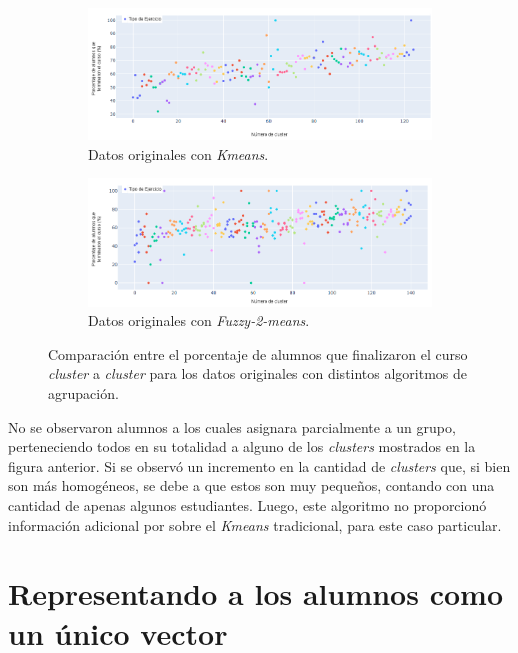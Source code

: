 \documentclass[11pt,a4paper,twoside,openany]{tesis}
\begin{document}
\begin{figure}[H]
    \centering
    \begin{subfigure}{0.45\textwidth}
        \includegraphics[width=\linewidth]{imagenes/porcentaje - original.png}
        \caption{Datos originales con \emph{Kmeans}.}
        \label{fig:figura5}
    \end{subfigure}
    \hfill
    \begin{subfigure}{0.45\textwidth}
        \includegraphics[width=\linewidth]{imagenes/porcentaje - fuzzy.png}
        \caption{Datos originales con \emph{Fuzzy-2-means}.}
        \label{fig:figura6}
    \end{subfigure}
    \caption{Comparación entre el porcentaje de alumnos que finalizaron el curso \emph{cluster} a \emph{cluster} para los datos originales con distintos algoritmos de agrupación.}
    \label{porcentajes}
\end{figure}

No se observaron alumnos a los cuales asignara parcialmente a un grupo, perteneciendo todos en su totalidad a alguno de los \emph{clusters} mostrados en la figura anterior. Si se observó un incremento en la cantidad de \emph{clusters} que, si bien son más homogéneos, se debe a que estos son muy pequeños, contando con una cantidad de apenas algunos estudiantes. Luego, este algoritmo no proporcionó información adicional por sobre el \emph{Kmeans} tradicional, para este caso particular.

\section{Representando a los alumnos como un único vector}
\end{document}
